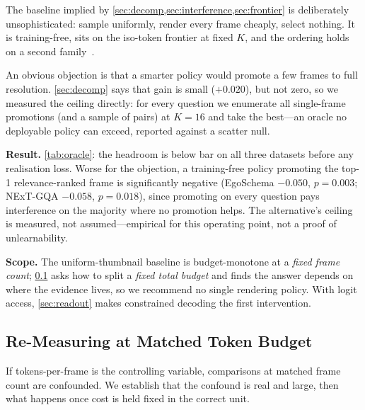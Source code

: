 \documentclass[10pt,twocolumn,letterpaper]{article}
\begin{document}
The baseline implied by \cref{sec:decomp,sec:interference,sec:frontier} is deliberately unsophisticated: sample uniformly, render every frame cheaply, select nothing. It is training-free, sits on the iso-token frontier at fixed $K$, and the ordering holds on a second family~\cite{li2024onevision,qwen25vl}.

An obvious objection is that a smarter policy would promote a few frames to full resolution. \cref{sec:decomp} says that gain is small ($+0.020$), but not zero, so we measured the ceiling directly: for every question we enumerate all single-frame promotions (and a sample of pairs) at $K{=}16$ and take the best---an oracle no deployable policy can exceed, reported against a scatter null.

\noindent\textbf{Result.} \cref{tab:oracle}: the headroom is below bar on all three datasets before any realisation loss. Worse for the objection, a training-free policy promoting the top-1 relevance-ranked frame is significantly negative (EgoSchema $-0.050$, $p{=}0.003$; NExT-GQA $-0.058$, $p{=}0.018$), since promoting on every question pays interference on the majority where no promotion helps. The alternative's ceiling is measured, not assumed---empirical for this operating point, not a proof of unlearnability.

\noindent\textbf{Scope.} The uniform-thumbnail baseline is budget-monotone at a \emph{fixed frame count}; \cref{sec:rebench} asks how to split a \emph{fixed total budget} and finds the answer depends on where the evidence lives, so we recommend no single rendering policy. With logit access, \cref{sec:readout} makes constrained decoding the first intervention.

\subsection{Re-Measuring at Matched Token Budget}
\label{sec:rebench}

If tokens-per-frame is the controlling variable, comparisons at matched frame count are confounded. We establish that the confound is real and large, then what happens once cost is held fixed in the correct unit.
\end{document}

